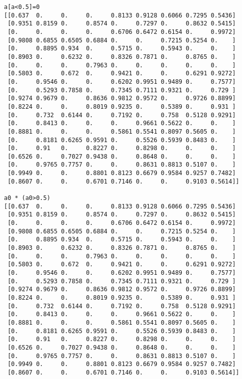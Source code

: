 \begin{verbatim}
a[a<0.5]=0
[[0.637  0.     0.     0.     0.8133 0.9128 0.6066 0.7295 0.5436]
 [0.9351 0.8159 0.     0.8574 0.     0.7297 0.     0.8632 0.5415]
 [0.     0.     0.     0.     0.6706 0.6472 0.6154 0.     0.9972]
 [0.9808 0.6855 0.6505 0.6884 0.     0.     0.7215 0.5254 0.    ]
 [0.     0.8895 0.934  0.     0.5715 0.     0.5943 0.     0.    ]
 [0.8903 0.     0.6232 0.     0.8326 0.7871 0.     0.8765 0.    ]
 [0.     0.     0.     0.7963 0.     0.     0.     0.     0.    ]
 [0.5803 0.     0.672  0.     0.9421 0.     0.     0.6291 0.9272]
 [0.     0.9546 0.     0.     0.6202 0.9951 0.9489 0.     0.7577]
 [0.     0.5293 0.7858 0.     0.7345 0.7111 0.9321 0.     0.729 ]
 [0.9274 0.9679 0.     0.8636 0.9812 0.9572 0.     0.9726 0.8899]
 [0.8224 0.     0.     0.8019 0.9235 0.     0.5389 0.     0.931 ]
 [0.     0.732  0.6144 0.     0.7192 0.     0.758  0.5128 0.9291]
 [0.     0.8413 0.     0.     0.     0.9661 0.5622 0.     0.    ]
 [0.8881 0.     0.     0.     0.5861 0.5541 0.8097 0.5605 0.    ]
 [0.     0.8181 0.6265 0.9591 0.     0.5526 0.5939 0.8483 0.    ]
 [0.     0.91   0.     0.8227 0.     0.8298 0.     0.     0.    ]
 [0.6526 0.     0.7027 0.9438 0.     0.8648 0.     0.     0.    ]
 [0.     0.9765 0.7757 0.     0.     0.8631 0.8813 0.5107 0.    ]
 [0.9949 0.     0.     0.8801 0.8123 0.6679 0.9584 0.9257 0.7482]
 [0.8607 0.     0.     0.6701 0.7146 0.     0.     0.9103 0.5614]]

a0 * (a0>0.5)
[[0.637  0.     0.     0.     0.8133 0.9128 0.6066 0.7295 0.5436]
 [0.9351 0.8159 0.     0.8574 0.     0.7297 0.     0.8632 0.5415]
 [0.     0.     0.     0.     0.6706 0.6472 0.6154 0.     0.9972]
 [0.9808 0.6855 0.6505 0.6884 0.     0.     0.7215 0.5254 0.    ]
 [0.     0.8895 0.934  0.     0.5715 0.     0.5943 0.     0.    ]
 [0.8903 0.     0.6232 0.     0.8326 0.7871 0.     0.8765 0.    ]
 [0.     0.     0.     0.7963 0.     0.     0.     0.     0.    ]
 [0.5803 0.     0.672  0.     0.9421 0.     0.     0.6291 0.9272]
 [0.     0.9546 0.     0.     0.6202 0.9951 0.9489 0.     0.7577]
 [0.     0.5293 0.7858 0.     0.7345 0.7111 0.9321 0.     0.729 ]
 [0.9274 0.9679 0.     0.8636 0.9812 0.9572 0.     0.9726 0.8899]
 [0.8224 0.     0.     0.8019 0.9235 0.     0.5389 0.     0.931 ]
 [0.     0.732  0.6144 0.     0.7192 0.     0.758  0.5128 0.9291]
 [0.     0.8413 0.     0.     0.     0.9661 0.5622 0.     0.    ]
 [0.8881 0.     0.     0.     0.5861 0.5541 0.8097 0.5605 0.    ]
 [0.     0.8181 0.6265 0.9591 0.     0.5526 0.5939 0.8483 0.    ]
 [0.     0.91   0.     0.8227 0.     0.8298 0.     0.     0.    ]
 [0.6526 0.     0.7027 0.9438 0.     0.8648 0.     0.     0.    ]
 [0.     0.9765 0.7757 0.     0.     0.8631 0.8813 0.5107 0.    ]
 [0.9949 0.     0.     0.8801 0.8123 0.6679 0.9584 0.9257 0.7482]
 [0.8607 0.     0.     0.6701 0.7146 0.     0.     0.9103 0.5614]]


\end{verbatim}
